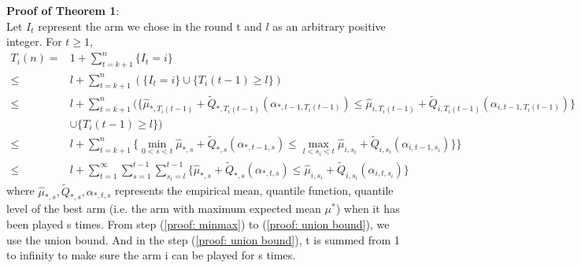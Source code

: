 \documentclass{article}
\begin{document}
\begin{enumerate}
\begin{enumerate}
    \textbf{Proof of Theorem 1}:\\
    Let $I_t$ represent the arm we chose in the round t and $l$ as an arbitrary positive integer. For $t \geq 1$,
    \begin{align}
        T_i(n) =& 1 + \sum_{t = k + 1}^n \{I_t = i\}\\
               \leq & l + \sum_{t = k + 1}^n (\{I_t = i\} \cup \{T_i(t-1) \geq l\})\\
               \leq  & l + \sum_{t = k + 1}^n (\{\hat{\mu}_{\ast, T_i(t-1)} + \tilde{Q}_{\ast,T_i(t-1)}(\alpha_{*,t-1, T_i(t-1)}) \leq \hat{\mu}_{i, T_i(t-1)} + \tilde{Q}_{i,T_i(t-1)}(\alpha_{i,t-1, T_i(t-1)})\} \\
               & \cup \{ T_i(t-1) \geq l\})\\
               \label{proof: minmax}
               \leq & l + \sum_{t = k + 1}^n \{ \mathop{min}\limits_{0 < s < t}\hat{\mu}_{\ast, s} + \tilde{Q}_{\ast, s}(\alpha_{\ast, t-1, s}) \leq \mathop{max}\limits_{l < s_i < t}\hat{\mu}_{i, s_i} + \tilde{Q}_{i, s_i}(\alpha_{i,t-1, s_i})\}\}\\
               \label{proof: union bound}
               \leq & l + \sum_{t = 1}^\infty \sum_{s = 1}^{t-1} \sum_{s_i = l}^{t-1} \{\hat{\mu}_{\ast, s} + \tilde{Q}_{\ast, s}(\alpha_{\ast, t, s})  \leq \hat{\mu}_{i, s_i} + \tilde{Q}_{i, s_i}(\alpha_{i,t, s_i})\}
    \end{align}
    where $\hat{\mu}_{\ast, s}, \tilde{Q}_{\ast, s}, \alpha_{\ast, t, s}$ represents the empirical mean, quantile function, quantile level of the best arm (i.e. the arm with maximum expected mean $\mu^\ast$) when it has been played s times. From step (\ref{proof: minmax}) to (\ref{proof: union bound}), we use the union bound. And in the step (\ref{proof: union bound}), t is summed from 1 to infinity to make sure the arm i can be played for s times.\\
    

\end{enumerate}
\end{enumerate}
\end{document}
